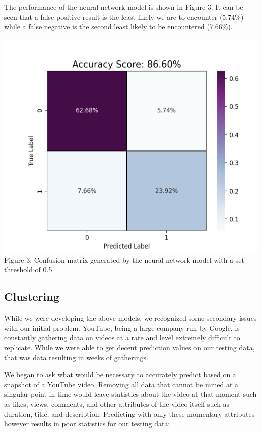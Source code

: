 \documentclass{article}
\begin{document}
The performance of the neural network model is shown in Figure 3. It can be seen that a false positive result is the least likely we are to encounter (5.74\%) while a false negative is the second least likely to be encountered (7.66\%).

\includegraphics[scale=.4]{chart5.png}\\

Figure 3: Confusion matrix generated by the neural network model with a set threshold of 0.5.

\subsection*{Clustering}
\quad While we were developing the above models, we recognized some secondary issues with our initial problem. YouTube, being a large company run by Google, is constantly gathering data on videos at a rate and level extremely difficult to replicate. While we were able to get decent prediction values on our testing data, that was data resulting in weeks of gatherings.
 
\par We began to ask what would be necessary to accurately predict based on a snapshot of a YouTube video. Removing all data that cannot be mined at a singular point in time would leave statistics about the video at that moment such as likes, views, comments, and other attributes of the video itself such as duration, title, and description. Predicting with only these momentary attributes however results in poor statistics for our testing data: \\
\end{document}
